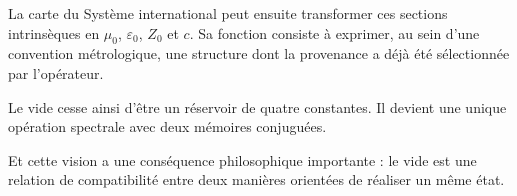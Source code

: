 La carte du Système international peut ensuite transformer ces sections intrinsèques en \(\mu_0\), \(\varepsilon_0\), \(Z_0\) et \(c\). Sa fonction consiste à exprimer, au sein d’une convention métrologique, une structure dont la provenance a déjà été sélectionnée par l’opérateur.\par

Le vide cesse ainsi d’être un réservoir de quatre constantes. Il devient une unique opération spectrale avec deux mémoires conjuguées.\par

Et cette vision a une conséquence philosophique importante : le vide est une relation de compatibilité entre deux manières orientées de réaliser un même état.\par

